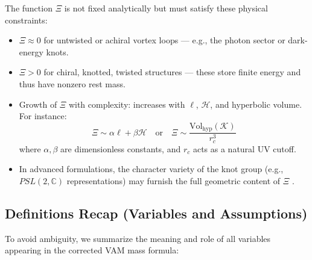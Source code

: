 The function $\Xi$ is not fixed analytically but must satisfy these physical constraints:

\begin{itemize}
    \item $\Xi \approx 0$ for untwisted or achiral vortex loops — e.g., the photon sector or dark-energy knots.

    \item $\Xi > 0$ for chiral, knotted, twisted structures — these store finite energy and thus have nonzero rest mass.

    \item Growth of $\Xi$ with complexity: increases with $\ell$, $\mathcal{H}$, and hyperbolic volume. For instance:
    \[
        \Xi \sim \alpha \ell + \beta \mathcal{H} \quad\text{or}\quad
        \Xi \sim \frac{\mathrm{Vol}_{\mathrm{hyp}}(\mathcal{K})}{r_c^3}
    \]
    where $\alpha, \beta$ are dimensionless constants, and $r_c$ acts as a natural UV cutoff.

    \item In advanced formulations, the character variety of the knot group (e.g., $PSL(2,\mathbb{C})$ representations) may furnish the full geometric content of $\Xi$ \cite{Petersen2023}.
\end{itemize}

\bigskip
\subsection{Definitions Recap (Variables and Assumptions)}

To avoid ambiguity, we summarize the meaning and role of all variables appearing in the corrected VAM mass formula:

